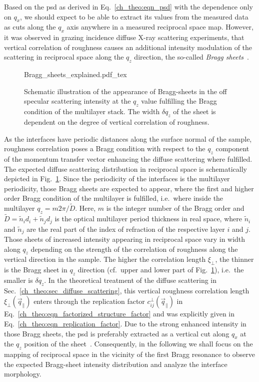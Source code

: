 Based on the \gls{psd} as derived in Eq.~\eqref{ch_theo:eqn_psd} with the dependence only on $q_x$, we should expect to be able to extract its values from the measured data as cuts along the $q_x$ axis anywhere in a measured reciprocal space map. However, it was observed in grazing incidence diffuse X-ray scattering experiments, that vertical correlation of roughness causes an additional intensity modulation of the scattering in reciprocal space along the $q_z$ direction, the so-called \emph{Bragg sheets}~\cite{jiang_nonspecular_1992, holy_nonspecular_1994, salditt_kinetic_1994, holy_interface_1995}.
\begin{figure}[htb]
    \def\svgwidth{\textwidth}
    {Bragg_sheets_explained.pdf_tex}
    \caption[Schematic illustration of the appearance of Bragg-sheets.]{Schematic illustration of the appearance of Bragg-sheets in the off specular scattering intensity at the $q_z$ value fulfilling the Bragg condition of the multilayer stack. The width $\delta q_z$ of the sheet is dependent on the degree of vertical correlation of roughness.}
    \label{ch_diff:fig_Bragg_sheets_explained} 
\end{figure}
As the interfaces have periodic distances along the surface normal of the sample, roughness correlation poses a Bragg condition with respect to the $q_z$ component of the momentum transfer vector enhancing the diffuse scattering where fulfilled. The expected diffuse scattering distribution in reciprocal space is schematically depicted in Fig.~\ref{ch_diff:fig_Bragg_sheets_explained}. Since the periodicity of the interfaces is the multilayer periodicity, those Bragg sheets are expected to appear, where the first and higher order Bragg condition of the multilayer is fulfilled, i.e.~where inside the multilayer $q_z=m 2 \pi /\tilde{D}$. Here, $m$ is the integer number of the Bragg order and $\tilde{D} = \tilde{n}_i d_i + \tilde{n}_j d_j$ is the optical multilayer period thickness in real space, where $\tilde{n}_i$ and $\tilde{n}_j$ are the real part of the index of refraction of the respective layer $i$ and $j$. Those sheets of increased intensity appearing in reciprocal space vary in width along $q_z$ depending on the strength of the correlation of roughness along the vertical direction in the sample. The higher the correlation length $\xi_\perp$, the thinner is the Bragg sheet in $q_z$ direction (cf.~upper and lower part of Fig.~\ref{ch_diff:fig_Bragg_sheets_explained}), i.e.~the smaller is $\delta q_z$. In the theoretical treatment of the diffuse scattering in Sec.~\ref{ch_theo:sec_diffuse_scattering}, this vertical roughness correlation length $\xi_\perp(\vec{q}_\parallel)$ enters through the replication factor $c_{ij}^{\perp}(\vec{q}_\parallel)$ in Eq.~\eqref{ch_theo:eqn_factorized_structure_factor} and was explicitly given in Eq.~\eqref{ch_theo:eqn_replication_factor}. Due to the strong enhanced intensity in those Bragg sheets, the \gls{psd} is preferably extracted as a vertical cut along $q_x$ at the $q_z$ position of the sheet~\cite{salditt_kinetic_1994,siffalovic_characterization_2009}. Consequently, in the following we shall focus on the mapping of reciprocal space in the vicinity of the first Bragg resonance to observe the expected Bragg-sheet intensity distribution and analyze the interface morphology.

